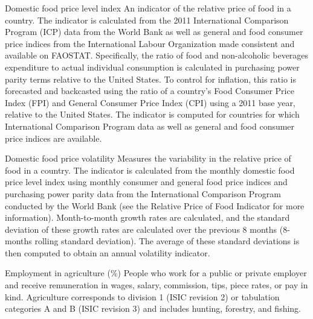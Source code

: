 \begin{MetadataCollection} {}
\begin{metadata}{Domestic food price level index} {}
An indicator of the relative price of food in a country. The indicator is calculated from the 2011 International Comparison Program (ICP) data from the World Bank as well as general and food consumer price indices from the International Labour Organization made consistent and available on FAOSTAT.  Specifically, the ratio of food and non-alcoholic beverages expenditure to actual individual consumption is calculated in purchasing power parity terms relative to  the United States. To control for inflation, this ratio is forecasted and backcasted using the ratio of a country's Food Consumer Price Index (FPI) and General Consumer Price Index (CPI) using a 2011 base year, relative to the United States. The indicator is computed for countries for which International Comparison Program data as well as general and food consumer price indices are available.
\end{metadata}

\begin{metadata}{Domestic food price volatility} {}
Measures the variability in the relative price of food in a country.  The indicator is calculated from the monthly domestic food price level index using monthly consumer and general food price indices and purchasing power parity data from the International Comparison Program conducted by the World Bank (see the Relative Price of Food Indicator for more information).  Month-to-month growth rates are calculated, and the standard deviation of these growth rates are calculated over the previous 8 months (8-months rolling standard deviation).  The average of these standard deviations is then computed to obtain an annual volatility indicator.
\end{metadata}

\begin{metadata}{Employment in agriculture (\%)} {}
People who work for a public or private employer and receive remuneration in wages, salary, commission, tips, piece rates, or pay in kind. Agriculture corresponds to division 1 (ISIC revision 2) or tabulation categories A and B (ISIC revision 3) and includes hunting, forestry, and fishing.
\end{metadata}


\end{MetadataCollection}
